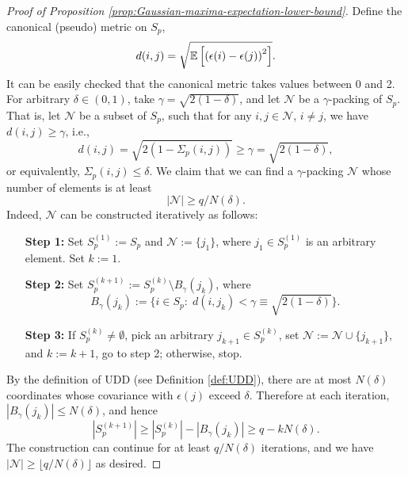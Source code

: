 \begin{proof}[Proof of Proposition \ref{prop:Gaussian-maxima-expectation-lower-bound}]
Define the canonical (pseudo) metric on $S_p$,
$$
d(i,j) = \sqrt{{\mathbb E}\left[\left(\epsilon(i)-\epsilon(j)\right)^2\right]}.
$$
It can be easily checked that the canonical metric takes values between 0 and 2.
For arbitrary $\delta\in(0,1)$, take $\gamma = \sqrt{2(1-\delta)}$, and
let $\mathcal{N}$ be a $\gamma$-packing of $S_p$. That is, let $\mathcal{N}$ be a subset of $S_p$, such that for any $i,j\in\mathcal{N}$, $i\neq j$, we have $d(i,j)\ge\gamma$, i.e.,
\begin{equation}\label{e:gamma-packing-def}
d(i,j) = \sqrt{2\left(1-\Sigma_p(i,j)\right)} \ge \gamma = \sqrt{2(1-\delta)},
\end{equation}
or equivalently, $\Sigma_p(i,j) \le \delta$.
We claim that we can find a $\gamma$-packing $\mathcal{N}$ whose number of elements is at least 
\begin{equation} \label{eq:packing-number-lower-bound}
    |\mathcal{N}| \ge q/N(\delta).
\end{equation}
Indeed, $\mathcal{N}$ can be constructed iteratively as follows:
\begin{itemize}[
    align=left,
    leftmargin=4em,
    itemindent=0pt,
    labelsep=0pt,
    labelwidth=4em
    ]
    \raggedright
    \item[{\bf Step 1:}] Set $S_p^{(1)}:=S_p$ and $\mathcal{N}:=\{j_1\}$, where $j_1\in S_p^{(1)}$ is an arbitrary element. Set $k:=1$.\\
    \item[{\bf Step 2:}] Set $S_p^{(k+1)}:=S_p^{(k)}\setminus B_\gamma(j_k)$, where
    $$
    B_\gamma(j_k) := \{i\in S_p: \;d(i,j_k) < \gamma \equiv \sqrt{2(1-\delta)}\}.
    $$
    \item[{\bf Step 3:}] If $S_p^{(k)} \neq \emptyset$, pick an arbitrary $j_{k+1}\in S_p^{(k)}$, set $\mathcal{N}:=\mathcal{N}\cup\{j_{k+1}\}$, and $k:=k+1$, go to step 2; otherwise, stop.
\end{itemize}
By the definition of UDD (see Definition \ref{def:UDD}), there are at most $N(\delta)$ coordinates whose covariance with $\epsilon(j)$ exceed $\delta$. 
Therefore at each iteration, $\left|B_\gamma(j_k)\right|\le N(\delta)$, and hence
$$
\left|S_p^{(k+1)}\right| \ge \left|S_p^{(k)}\right| - \left| B_\gamma(j_k)\right| \ge q - kN(\delta).
$$
The construction can continue for at least $q/N(\delta)$ iterations, and we have $|\mathcal{N}| \ge \lfloor q/N(\delta) \rfloor$ as desired.
    

\end{proof}
